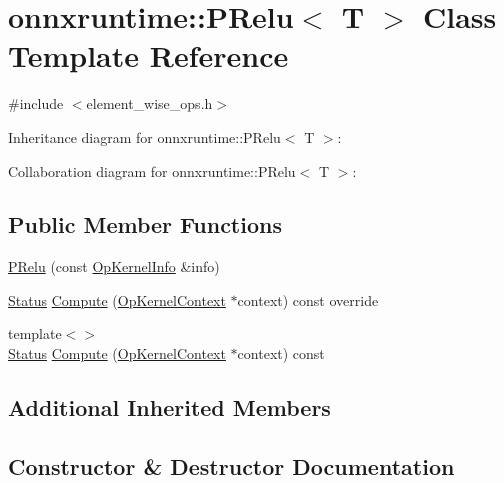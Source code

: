 \hypertarget{classonnxruntime_1_1PRelu}{}\section{onnxruntime\+:\+:P\+Relu$<$ T $>$ Class Template Reference}
\label{classonnxruntime_1_1PRelu}


{\ttfamily \#include $<$element\+\_\+wise\+\_\+ops.\+h$>$}



Inheritance diagram for onnxruntime\+:\+:P\+Relu$<$ T $>$\+:


Collaboration diagram for onnxruntime\+:\+:P\+Relu$<$ T $>$\+:
\subsection*{Public Member Functions}
\begin{DoxyCompactItemize}
\item 
\mbox{\hyperlink{classonnxruntime_1_1PRelu_a9de84023e4ebd89e0cfd40ad5074a941}{P\+Relu}} (const \mbox{\hyperlink{classonnxruntime_1_1OpKernelInfo}{Op\+Kernel\+Info}} \&info)
\item 
\mbox{\hyperlink{classonnxruntime_1_1common_1_1Status}{Status}} \mbox{\hyperlink{classonnxruntime_1_1PRelu_ad2bcecf9e193b0681308e5793c1ea5f8}{Compute}} (\mbox{\hyperlink{classonnxruntime_1_1OpKernelContext}{Op\+Kernel\+Context}} $\ast$context) const override
\item 
{\footnotesize template$<$$>$ }\\\mbox{\hyperlink{classonnxruntime_1_1common_1_1Status}{Status}} \mbox{\hyperlink{classonnxruntime_1_1PRelu_a8dd040539db082cc21e9b01fc6cfc4d9}{Compute}} (\mbox{\hyperlink{classonnxruntime_1_1OpKernelContext}{Op\+Kernel\+Context}} $\ast$context) const
\end{DoxyCompactItemize}
\subsection*{Additional Inherited Members}


\subsection{Constructor \& Destructor Documentation}
\mbox{\label{classonnxruntime_1_1PRelu_a9de84023e4ebd89e0cfd40ad5074a941}} 
